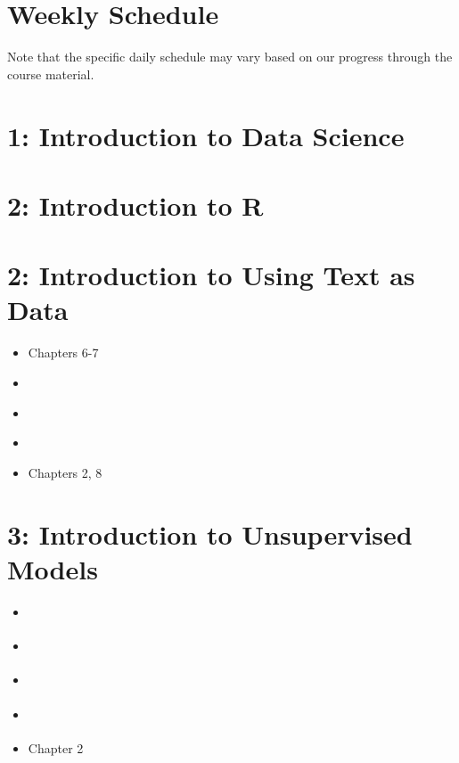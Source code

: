 \documentclass[]{article}
\begin{document}
	\section*{Weekly Schedule}
	Note that the specific daily schedule may vary based on our progress through the course material.
	
	\section*{\textnormal{1: Introduction to Data Science}}
	
	
		\section*{\textnormal{2: Introduction to R}}
	
	
	\section*{\textnormal{2: Introduction to Using Text as Data }}

	\begin{itemize}
		\item \cite{campbell1966stokes} Chapters 6-7
		\item \cite{converse1969time}
		\item \cite{franklin1983dynamics}
		\item \cite{gerber1998rational}
		\item \cite{green2002partisan} Chapters 2, 8

	\end{itemize}
	
	\section*{\textnormal{3: Introduction to Unsupervised Models}}

	
	
	
	\begin{itemize}
		\item \cite{carpini1993measuring} 
		\item \cite{carpini1991stability}

		\item \cite{jerit2012partisan}
		\item \cite{taber2006motivated} 
		\item \cite{lodge2013rationalizing} Chapter 2
		
	\end{itemize}
\end{document}
